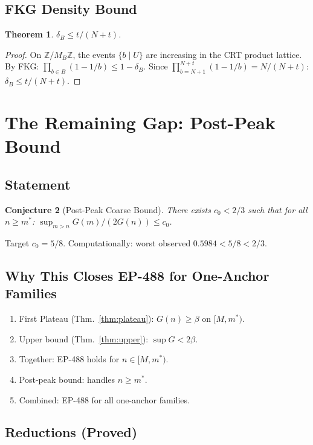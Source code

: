 \documentclass[11pt,a4paper]{article}
\newtheorem{theorem}{Theorem}[section]
\newtheorem{conjecture}[theorem]{Conjecture}
\theoremstyle{definition}
\begin{document}
\subsection{FKG Density Bound}

\begin{theorem}\label{thm:fkg}
$\delta_B \leq t/(N+t)$.
\end{theorem}

\begin{proof}
On $\mathbb{Z}/M_B\mathbb{Z}$, the events $\{b \mid U\}$ are increasing
in the CRT product lattice. By FKG:
$\prod_{b \in B}(1 - 1/b) \leq 1 - \delta_B$.
Since $\prod_{b=N+1}^{N+t}(1-1/b) = N/(N+t)$: $\delta_B \leq t/(N+t)$.
\end{proof}

\section{The Remaining Gap: Post-Peak Bound}

\subsection{Statement}

\begin{conjecture}[Post-Peak Coarse Bound]\label{conj:postpeak}
There exists $c_0 < 2/3$ such that for all $n \geq m^*$:
$\sup_{m>n} G(m) / (2G(n)) \leq c_0$.
\end{conjecture}

Target $c_0 = 5/8$. Computationally: worst observed $0.5984 < 5/8 < 2/3$.

\subsection{Why This Closes EP-488 for One-Anchor Families}

\begin{enumerate}
\item First Plateau (Thm.~\ref{thm:plateau}): $G(n) \geq \beta$ on $[M, m^*)$.
\item Upper bound (Thm.~\ref{thm:upper}): $\sup G < 2\beta$.
\item Together: EP-488 holds for $n \in [M, m^*)$.
\item Post-peak bound: handles $n \geq m^*$.
\item Combined: EP-488 for all one-anchor families.
\end{enumerate}

\subsection{Reductions (Proved)}
\end{document}
